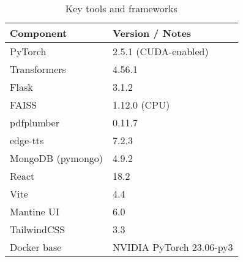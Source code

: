 \documentclass[conference]{IEEEtran}
\begin{document}
\begin{table}[h]
  \centering
  \caption{Key tools and frameworks}
  \label{tab:tools}
  \begin{tabular}{ll}
    \toprule
    Component & Version / Notes \\
    \midrule
    PyTorch & 2.5.1 (CUDA-enabled) \\
    Transformers & 4.56.1 \\
    Flask & 3.1.2 \\
    FAISS & 1.12.0 (CPU) \\
    pdfplumber & 0.11.7 \\
    edge-tts & 7.2.3 \\
    MongoDB (pymongo) & 4.9.2 \\
    React & 18.2 \\
    Vite & 4.4 \\
    Mantine UI & 6.0 \\
    TailwindCSS & 3.3 \\
    Docker base & NVIDIA PyTorch 23.06-py3 \\
    \bottomrule
  \end{tabular}
\end{table}



\end{document}
